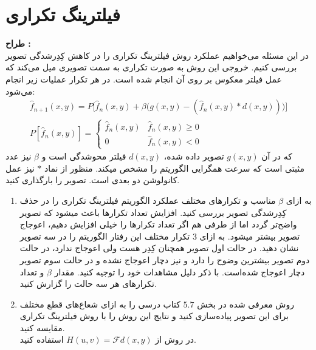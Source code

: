 \documentclass[a4paper]{article}
\begin{document}
\section{فیلترینگ تکراری}
\textbf{طراح : }
\vspace{0.5cm}
\\
در این مسئله می‌خواهیم عملکرد روش  فیلترینگ تکراری را در کاهش کِدِرشدگی تصویر بررسی کنیم. خروجی این روش به صورت تکراری به سمت تصویری میل می‌کند که عمل فیلتر معکوس بر روی آن انجام شده است. در هر تکرار عملیات زیر انجام می‌شود:
\begin{gather} 
	\hat{f}_{n+1}(x,y) = P \Big[ \hat{f}_{n}(x,y) + \beta \big(g(x,y) - (\hat{f}_{n}(x,y) * d(x,y))\big)\Big]
	\\
	P [\hat{f}_{n}(x,y)] = \begin{cases}
		\hat{f}_{n}(x,y)  & \hat{f}_{n}(x,y) \geq 0
		\\ 
		0 & \hat{f}_{n}(x,y) < 0
	\end{cases}
\end{gather}
که در آن 
$ g(x,y) $
تصویر داده شده،
$ d(x,y) $
فیلتر محوشدگی است و 
$ \beta $
نیز عدد مثبتی است که سرعت همگرایی الگوریتم را مشخص میکند. منظور از نماد $ * $ نیز عمل کانولوشن دو بعدی است. تصویر
 را بارگذاری کنید.
\begin{enumerate}
	\item 
	به ازای $ \beta $ مناسب و تکرارهای مختلف عملکرد الگوریتم فیلترینگ تکراری را در حذف کِدِرشدگی تصویر بررسی کنید. افزایش تعداد تکرارها باعث میشود که تصویر  واضح‌تر گردد اما از طرفی هم اگر تعداد تکرارها را خیلی افزایش دهیم، اعوجاج تصویر بیشتر میشود. به ازای $ 3  $ تکرار مختلف این رفتار الگوریتم را در سه تصویر نشان دهید. در حالت اول تصویر همچنان کِدِر هست ولی اعوجاج ندارد، در حالت دوم تصویر بیشترین وضوح را دارد و نیز دچار اعوجاج نشده و در حالت سوم تصویر دچار اعوجاج شده‌است. با ذکر دلیل مشاهدات خود را توجیه کنید. مقدار $ \beta $‌ و تعداد تکرارهای هر سه حالت را گزارش کنید.
	\item 
روش
معرفی شده در بخش $ 5.7 $ کتاب درسی را به ازای شعاع‌های قطع مختلف برای این تصویر پیاده‌سازی کنید و نتایج این روش را با روش فیلترینگ تکراری مقایسه کنید.
\\
در روش 
از
 $ H(u,v)=\mathcal{F}{d(x,y)} $ 
استفاده کنید.
\end{enumerate}
\end{document}
